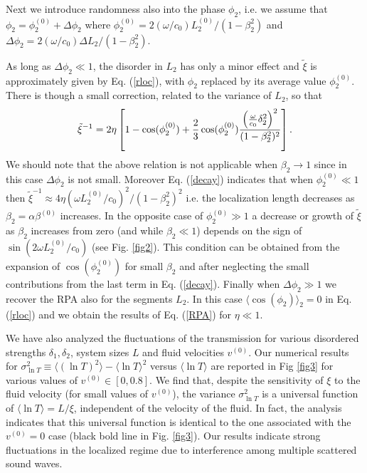 \documentclass[aps,prl,twocolumn,groupedaddress,amsmath,amssymb]{revtex4}
\begin{document}
Next we introduce randomness also into the phase $\phi_2$, i.e. we assume that $\phi_2=\phi_2^{(0)}+\Delta \phi_2$ where $\phi_2^{(0)}=
2(\omega/c_0)L_2^{(0)}/(1-\beta_2^2)$ and $\Delta \phi_2=2(\omega/c_0)\Delta L_2/(1-\beta_2^2)$. 

As long as $\Delta\phi_2\ll1$,  the disorder in $L_2$ has only a minor effect and ${\tilde \xi}$ is approximately given by Eq. (\ref{rloc}), 
with $\phi_2$ replaced by its average value $\phi_2^{(0)}$. There is though a small correction, related to the variance of $L_2$, 
so that
\begin{equation}
\label{decay}
{\tilde \xi}^{-1}=2\eta\left[1-\cos(\phi_2^{(0)}) + {2\over 3}\cos(\phi_2^{(0)}) 
{\left({\omega\over c_0} \delta_2^2\right)^2 \over(1-\beta_2^2)^2}\right].
\end{equation}
We should note that the above relation is not applicable when $\beta_2\rightarrow 1$ since in this case $\Delta\phi_2$ is not small. Moreover
Eq. (\ref{decay}) indicates that when $\phi_2^{(0)}\ll 1$ then ${\tilde \xi}^{-1}\approx 4\eta (\omega L_2^{(0)}/c_0)^2/(1-\beta_2^2)^2$ i.e.
the localization length decreases as $\beta_2=\alpha \beta^{(0)}$ increases. In the opposite case of $\phi_2^{(0)}\gg 1$ a decrease or growth of  
${\tilde \xi}$ as $\beta_2$ increases from zero (and while $\beta_2\ll 1$) depends on the sign of $\sin(2\omega L_2^{(0)}/c_0)$ (see Fig. 
\ref{fig2}). This condition can be obtained from the expansion of $\cos(\phi_2^{(0)})$ for small $\beta_2$ and after neglecting the small 
contributions from the last term in Eq. (\ref{decay}). Finally when $\Delta \phi_2\gg1$ we recover the RPA also for the segments $L_2$. In this case $\langle 
\cos(\phi_2)\rangle_2=0$ in Eq. (\ref{rloc}) and we obtain the results of Eq. (\ref{RPA}) for $\eta\ll 1$.



We have also analyzed the fluctuations of the transmission for various disordered strengths $\delta_1,\delta_2$, system sizes $L$ and
fluid velocities $v^{(0)}$. Our numerical results for $\sigma^2_{\ln T}\equiv \langle (\ln T)^2\rangle -\langle \ln T\rangle^2$
versus $\langle \ln T\rangle$ are reported in Fig \ref{fig3} for various values of $v^{(0)}\in [0, 0.8]$. We find that, despite the sensitivity
of $\xi$ to the fluid velocity (for small values of $v^{(0)}$), the variance $\sigma^2_{\ln T}$ is a universal function of $\langle \ln T\rangle
=L/\xi$, independent of the velocity of the fluid. In fact, the analysis indicates that this universal function is identical to the one associated
with the $v^{(0)}=0$ case (black bold line in Fig. \ref{fig3}). Our results indicate strong fluctuations in the localized regime due to interference 
among multiple scattered sound waves. 
\end{document}
